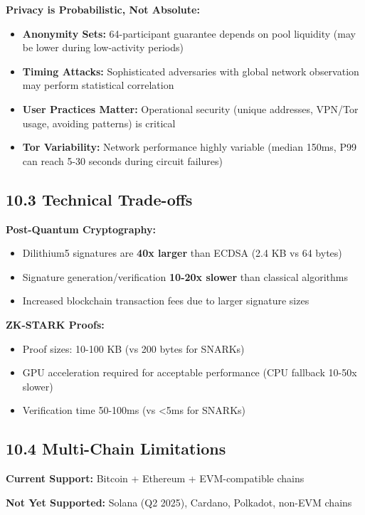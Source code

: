 \documentclass[11pt,a4paper]{article}
\begin{document}
\textbf{Privacy is Probabilistic, Not Absolute:}
\begin{itemize}
    \item \textbf{Anonymity Sets:} 64-participant guarantee depends on pool liquidity (may be lower during low-activity periods)
    \item \textbf{Timing Attacks:} Sophisticated adversaries with global network observation may perform statistical correlation
    \item \textbf{User Practices Matter:} Operational security (unique addresses, VPN/Tor usage, avoiding patterns) is critical
    \item \textbf{Tor Variability:} Network performance highly variable (median 150ms, P99 can reach 5-30 seconds during circuit failures)
\end{itemize}

\subsection{10.3 Technical Trade-offs}

\textbf{Post-Quantum Cryptography:}
\begin{itemize}
    \item Dilithium5 signatures are \textbf{40x larger} than ECDSA (2.4 KB vs 64 bytes)
    \item Signature generation/verification \textbf{10-20x slower} than classical algorithms
    \item Increased blockchain transaction fees due to larger signature sizes
\end{itemize}

\textbf{ZK-STARK Proofs:}
\begin{itemize}
    \item Proof sizes: 10-100 KB (vs 200 bytes for SNARKs)
    \item GPU acceleration required for acceptable performance (CPU fallback 10-50x slower)
    \item Verification time 50-100ms (vs <5ms for SNARKs)
\end{itemize}

\subsection{10.4 Multi-Chain Limitations}

\textbf{Current Support:} Bitcoin + Ethereum + EVM-compatible chains

\textbf{Not Yet Supported:} Solana (Q2 2025), Cardano, Polkadot, non-EVM chains
\end{document}
